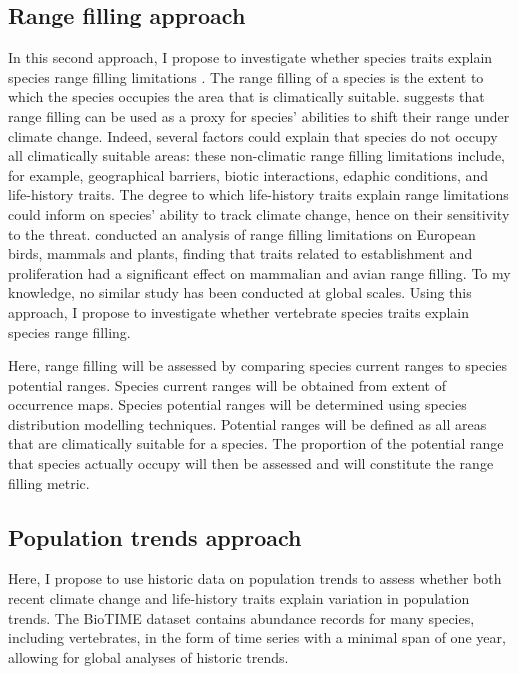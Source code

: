\subsection{Range filling approach}
In this second approach, I propose to investigate whether species traits explain species range filling limitations \citep{Estrada2018}. The range filling of a species is the extent to which the species occupies the area that is climatically suitable. \citet{Estrada2018} suggests that range filling can be used as a proxy for species' abilities to shift their range under climate change. Indeed, several factors could explain that species do not occupy all climatically suitable areas: these non-climatic range filling limitations include, for example, geographical barriers, biotic interactions, edaphic conditions, and life-history traits. 
The degree to which life-history traits explain range limitations could inform on species' ability to track climate change, hence on their sensitivity to the threat. \citet{Estrada2018} conducted an analysis of range filling limitations on European birds, mammals and plants, finding that traits related to establishment and proliferation had a significant effect on mammalian and avian range filling.  To my knowledge, no similar study has been conducted at global scales. Using this approach, I propose to investigate whether vertebrate species traits explain species range filling.

Here, range filling will be assessed by comparing species current ranges to species potential ranges. Species current ranges will be obtained from extent of occurrence maps. Species potential ranges will be determined using species distribution modelling techniques. Potential ranges will be defined as all areas that are climatically suitable for a species. The proportion of the potential range that species actually occupy will then be assessed and will constitute the range filling metric.

\subsection{Population trends approach}
Here, I propose to use historic data on population trends to assess whether both recent climate change and life-history traits explain variation in population trends. The BioTIME dataset \citep{Dornelas2018} contains abundance records for many species, including vertebrates, in the form of time series with a minimal span of one year, allowing for global analyses of historic trends. 

